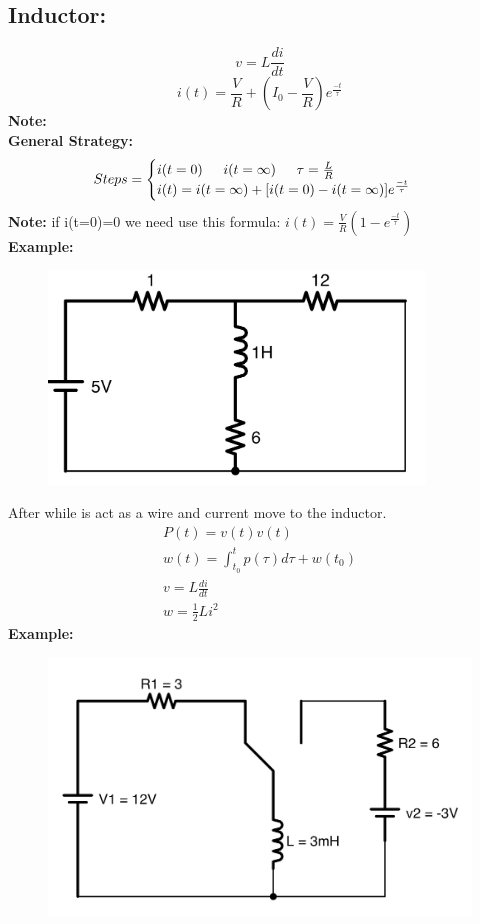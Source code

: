 \documentclass[a4paper,12]{article}
\begin{document}
\subsection{Inductor:}
\[v=L \frac{di}{dt}\]
\[i(t)=\frac{V}{R}+(I_0-\frac{V}{R})e^{\frac{-t}{\tau}}\]
\textbf{Note:}\\
\textbf{General Strategy:}
\begin{gather*}
    Steps=\begin{cases}
     i(t=0) \indent i(t=\infty) \indent \tau=\frac{L}{R}\\
     i(t)=i(t=\infty)+[i(t=0)-i(t=\infty)]e^{\frac{-t}{\tau}}
    \end{cases}
\end{gather*}
\textbf{Note:} if i(t=0)=0 we need use this formula: $i(t)=\frac{V}{R}(1-e^{\frac{-t}{\tau}})$\\
\textbf{Example:}
\begin{figure}[H]
    \centering
    \includegraphics[width=100mm]{Image/22.jpeg}
\end{figure}
After while is act as a wire and current move to the inductor.\\
\begin{gather}
    P(t)=v(t)v(t)\\
    w(t)=\int _{t_0}^{t}p(\tau)d\tau +w(t_0)\\
    v=L \frac{di}{dt}\\
    w=\frac{1}{2}Li^2
    \end{gather}
    \textbf{Example:}\\
    \begin{figure}[H]
        \centering
        \includegraphics[width=120mm]{Image/23.jpeg}
    \end{figure}
\end{document}
